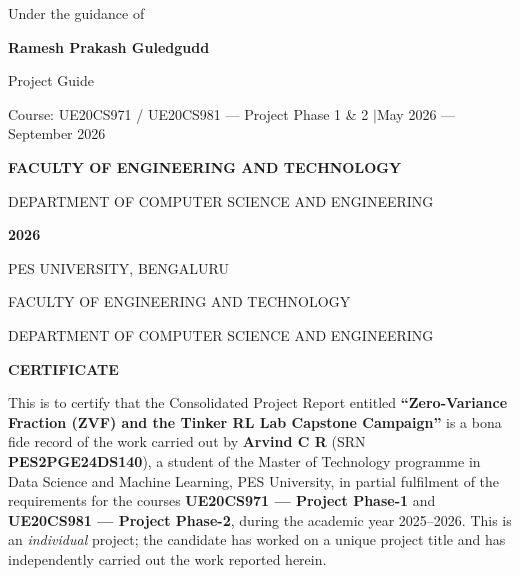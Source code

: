 \documentclass[12pt,a4paper]{report}
\begin{document}
\begin{titlepage}
\vspace{0.5em}
{\normalsize Under the guidance of\par}
\vspace{0.2em}
{\large\bfseries Ramesh Prakash Guledgudd\par}
{\normalsize Project Guide\par}

\vfill

{\normalsize Course: UE20CS971 / UE20CS981 --- Project Phase 1 \& 2 \quad$\vert$\quad May 2026 --- September 2026\par}
\vspace{0.3em}
{\large\bfseries FACULTY OF ENGINEERING AND TECHNOLOGY\par}
{\normalsize DEPARTMENT OF COMPUTER SCIENCE AND ENGINEERING\par}
\vspace{0.2em}
{\large\bfseries 2026\par}

\end{titlepage}

\thispagestyle{empty}
\begin{center}
{\large PES UNIVERSITY, BENGALURU\par}
{\normalsize FACULTY OF ENGINEERING AND TECHNOLOGY\par}
{\normalsize DEPARTMENT OF COMPUTER SCIENCE AND ENGINEERING\par}
\vspace{1.0em}
{\Large\bfseries CERTIFICATE\par}
\end{center}
\vspace{1.0em}

This is to certify that the Consolidated Project Report entitled
\textbf{``Zero-Variance Fraction (ZVF) and the Tinker RL Lab Capstone
Campaign''} is a bona fide record of the work carried out by \textbf{Arvind C R}
(SRN \textbf{PES2PGE24DS140}), a student of the Master of Technology programme in
Data Science and Machine Learning, PES University, in partial fulfilment of the
requirements for the courses \textbf{UE20CS971 --- Project Phase-1} and
\textbf{UE20CS981 --- Project Phase-2}, during the academic year 2025--2026. This
is an \emph{individual} project; the candidate has worked on a unique project
title and has independently carried out the work reported herein.
\end{document}
